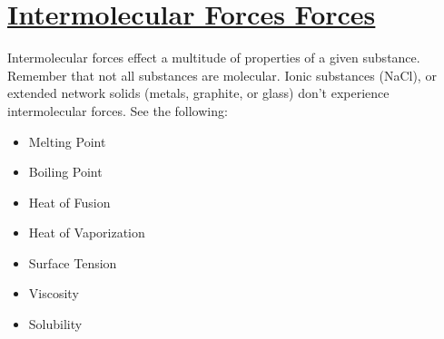 \documentclass{article}
\begin{document}
\pagebreak

\section*{\LARGE\uline{Intermolecular Forces Forces}}
Intermolecular forces effect a multitude of properties of a given substance. Remember that not all substances are molecular. Ionic substances (NaCl), or extended network solids (metals, graphite, or glass) don't experience intermolecular forces. See the following:
\begin{qq}

	\begin{center}

		\hspace{18pt}\begin{minipage}{0.2\textwidth}
			\begin{itemize}[leftmargin=*]
				\item Melting Point
				\item Boiling Point

			\end{itemize}
		\end{minipage}
		\hspace{10pt}\begin{minipage}{0.3\textwidth}
			\begin{itemize}[leftmargin=*]
				\item Heat of Fusion
				\item Heat of Vaporization
			\end{itemize}
		\end{minipage}
		\begin{minipage}{0.22\textwidth}
			\begin{itemize}[leftmargin=*]
				\item Surface Tension
				\item Viscosity
			\end{itemize}
		\end{minipage}
		\begin{minipage}{0.2\textwidth}
			\begin{itemize}[leftmargin=*]
				\item Solubility
			\end{itemize}
		\end{minipage}

	\end{center}
\end{qq}

\renewcommand{\Tstrut}{\rule{0pt}{6ex}}         %
\renewcommand{\Bstrut}{\rule[-4ex]{0pt}{0pt}}   %
\renewcommand{\TBstrut}{\Tstrut\Bstrut}            %
\end{document}
